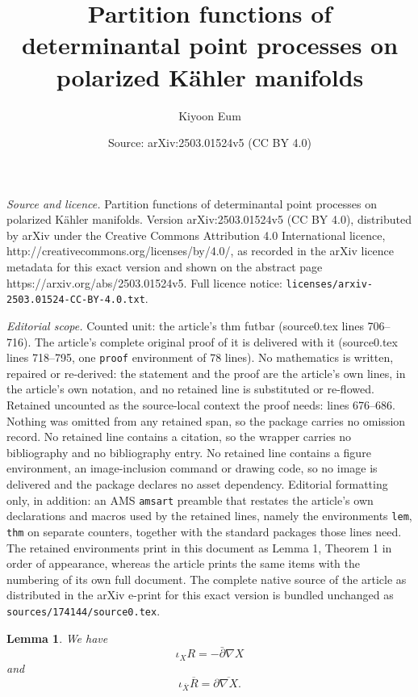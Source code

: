 \documentclass[10pt,a4paper]{amsart}
\title{Partition functions of determinantal point processes on polarized K\"ahler manifolds}
\author{Kiyoon Eum}
\date{Source: arXiv:2503.01524v5 (CC BY 4.0)}
\newtheorem{lem}{Lemma}
\def\bp{\bar\partial}
\def\p{\partial}
\begin{document}
\maketitle

\noindent\emph{Source and licence.} Partition functions of determinantal point processes on polarized K\"ahler manifolds. Version arXiv:2503.01524v5 (CC BY 4.0), distributed by arXiv under the Creative Commons Attribution 4.0 International licence, http://creativecommons.org/licenses/by/4.0/, as recorded in the arXiv licence metadata for this exact version and shown on the abstract page https://arxiv.org/abs/2503.01524v5. Full licence notice: \texttt{licenses/arxiv-2503.01524-CC-BY-4.0.txt}.\par\smallskip

\noindent\textit{Editorial scope.} Counted unit: the article's thm futbar (source0.tex lines 706--716). The article's complete original proof of it is delivered with it (source0.tex lines 718--795, one \texttt{proof} environment of 78 lines). No mathematics is written, repaired or re-derived: the statement and the proof are the article's own lines, in the article's own notation, and no retained line is substituted or re-flowed.  Retained uncounted as the source-local context the proof needs: lines 676--686.  Nothing was omitted from any retained span, so the package carries no omission record.  No retained line contains a citation, so the wrapper carries no bibliography and no bibliography entry.  No retained line contains a figure environment, an image-inclusion command or drawing code, so no image is delivered and the package declares no asset dependency.  Editorial formatting only, in addition: an AMS \texttt{amsart} preamble that restates the article's own declarations and macros used by the retained lines, namely the environments \texttt{lem}, \texttt{thm} on separate counters, together with the standard packages those lines need.  The retained environments print in this document as Lemma 1, Theorem 1 in order of appearance, whereas the article prints the same items with the numbering of its own full document.  The complete native source of the article as distributed in the arXiv e-print for this exact version is bundled unchanged as \texttt{sources/174144/source0.tex}.
\begin{lem}\label{lulemm}
We have
\begin{equation}\label{nabx}
\iota_X R = -\bp \nabla X
\end{equation}
and 
\begin{equation}\label{nabx2}
\iota_{\overline{X}} \overline{R} = \p \overline{\nabla X}.
\end{equation}

\end{lem}
\end{document}
